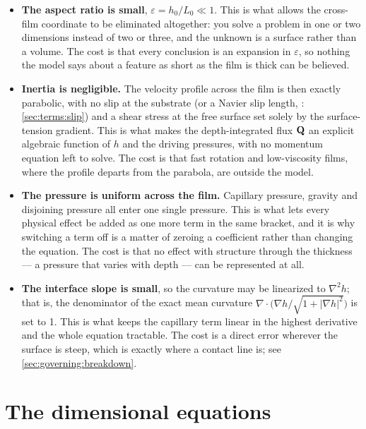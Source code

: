 \begin{itemize}
  \item \textbf{The aspect ratio is small}, $\varepsilon = h_0/L_0 \ll 1$. This
    is what allows the cross-film coordinate to be eliminated altogether: you
    solve a problem in one or two dimensions instead of two or three, and the
    unknown is a surface rather than a volume. The cost is that every
    conclusion is an expansion in $\varepsilon$, so nothing the model says
    about a feature as short as the film is thick can be believed.
  \item \textbf{Inertia is negligible.} The velocity profile across the film is
    then exactly parabolic, with no slip at the substrate (or a Navier slip
    length, : \cref{sec:terms:slip}) and a shear stress at
    the free surface set solely by the surface-tension gradient. This is what
    makes the depth-integrated flux $\mathbf{Q}$ an explicit algebraic function of
    $h$ and the driving pressures, with no momentum equation left to solve. The
    cost is that fast rotation and low-viscosity films, where the profile
    departs from the parabola, are outside the model.
  \item \textbf{The pressure is uniform across the film.} Capillary pressure,
    gravity and disjoining pressure all enter one single pressure. This is what
    lets every physical effect be added as one more term in the same bracket,
    and it is why switching a term off is a matter of zeroing a coefficient
    rather than changing the equation. The cost is that no effect with
    structure through the thickness --- a pressure that varies with depth ---
    can be represented at all.
  \item \textbf{The interface slope is small}, so the curvature may be
    linearized to $\nabla^2 h$; that is, the denominator of the exact mean
    curvature $\nabla\cdot\bigl(\nabla h/\sqrt{1+|\nabla h|^2}\bigr)$ is set to
    1. This is what keeps the capillary term linear in the highest derivative
    and the whole equation tractable. The cost is a direct error wherever the
    surface is steep, which is exactly where a contact line is; see
    \cref{sec:governing:breakdown}.
\end{itemize}

\section{The dimensional equations}
\label{sec:governing:dimensional}

